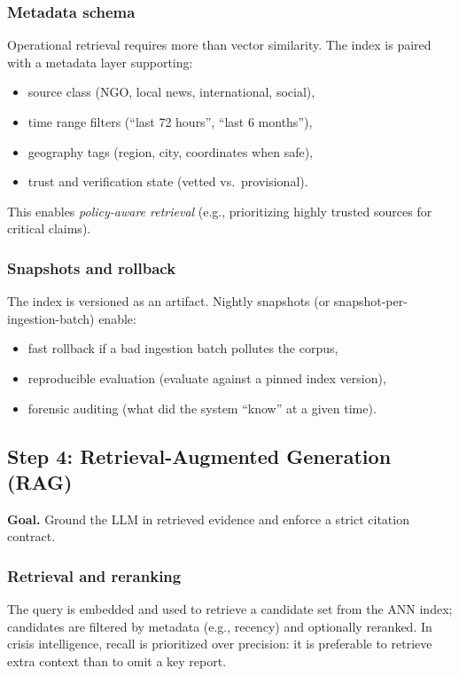\subsubsection{Metadata schema}
Operational retrieval requires more than vector similarity. The index is paired with a metadata layer supporting:
\begin{itemize}
    \item source class (NGO, local news, international, social),
    \item time range filters (``last 72 hours'', ``last 6 months''),
    \item geography tags (region, city, coordinates when safe),
    \item trust and verification state (vetted vs.\ provisional).
\end{itemize}
This enables \emph{policy-aware retrieval} (e.g., prioritizing highly trusted sources for critical claims).

\subsubsection{Snapshots and rollback}
The index is versioned as an artifact.
Nightly snapshots (or snapshot-per-ingestion-batch) enable:
\begin{itemize}
    \item fast rollback if a bad ingestion batch pollutes the corpus,
    \item reproducible evaluation (evaluate against a pinned index version),
    \item forensic auditing (what did the system ``know'' at a given time).
\end{itemize}

\subsection{Step 4: Retrieval-Augmented Generation (RAG)}
\label{sec:ishtar-step-rag}

\textbf{Goal.} Ground the LLM in retrieved evidence and enforce a strict citation contract.

\subsubsection{Retrieval and reranking}
The query is embedded and used to retrieve a candidate set from the ANN index; candidates are filtered by metadata (e.g., recency) and optionally reranked.
In crisis intelligence, recall is prioritized over precision: it is preferable to retrieve extra context than to omit a key report.

